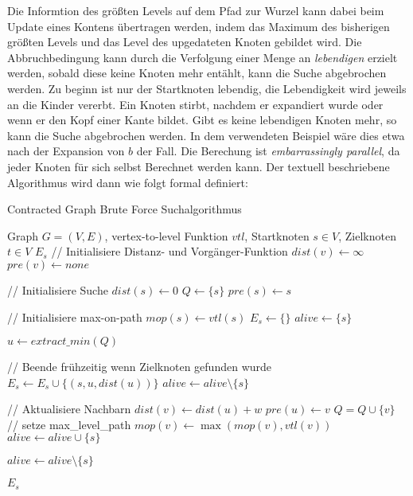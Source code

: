 Die Informtion des größten Levels auf dem Pfad zur Wurzel kann dabei beim Update eines Kontens übertragen werden, indem das Maximum des bisherigen größten Levels und das Level des upgedateten Knoten gebildet wird.
Die Abbruchbedingung kann durch die Verfolgung einer Menge an \emph{lebendigen} erzielt werden, sobald diese keine Knoten mehr entählt, kann die Suche abgebrochen werden.
Zu beginn ist nur der Startknoten lebendig, die Lebendigkeit wird jeweils an die Kinder vererbt.
Ein Knoten stirbt, nachdem er expandiert wurde oder wenn er den Kopf einer Kante bildet.
Gibt es keine lebendigen Knoten mehr, so kann die Suche abgebrochen werden.
In dem verwendeten Beispiel wäre dies etwa nach der Expansion von $b$ der Fall.
Die Berechung ist \emph{embarrassingly parallel}, da jeder Knoten für sich selbst Berechnet werden kann.
Der textuell beschriebene Algorithmus wird dann wie folgt formal definiert:

\begin{algorithm}[ht]
    \caption{Contracted Graph Brute Force Suchalgorithmus}
    \begin{algorithmic}[1]
        \Require Graph $G = (V, E)$, vertex-to-level Funktion ${vtl}$, Startknoten $s \in V$, Zielknoten $t \in V$
        \Ensure $E_s$
        \State // Initialisiere Distanz- und Vorgänger-Funktion
        \State ${dist}(v) \leftarrow \infty$
        \State ${pre}(v) \leftarrow {none}$
        \EndFor


        \State
        \State // Initialisiere Suche
        \State ${dist}(s) \leftarrow 0$
        \State $Q\leftarrow \{ s \}$
        \State ${pre}(s) \leftarrow s$

        \State
        \State // Initialisiere max-on-path
        \State ${mop}(s) \leftarrow {vtl}(s)$
        \State $E_s \leftarrow \{ \}$
        \State ${alive} \leftarrow \{ s \}$

        \State
        \State $u \leftarrow{extract\_min}(Q)$\label{graphs:dijkstra:pop}

        \State
        \State // Beende frühzeitig wenn Zielknoten gefunden wurde
        \State $E_s \leftarrow E_s \cup \{ (s, u, {dist}(u)) \}$
        \State ${alive} \leftarrow {alive} \setminus \{ s \}$
        \EndIf

        \State
        \State // Aktualisiere Nachbarn
        \State ${dist}(v) \leftarrow {dist}(u) + w$
        \State ${pre}(u) \leftarrow v$
        \State $Q = Q \cup \{ v \}$
        \State
        \State // setze max\_level\_path
        \State ${mop}(v) \leftarrow \max({mop}(v), {vtl}(v))$
        \State ${alive} \leftarrow {alive} \cup \{ s \}$
        \EndIf
        \EndIf
        \EndFor


        \State ${alive} \leftarrow {alive} \setminus \{ s \}$

        \EndWhile

        \State
        \State \Return $E_s$
    \end{algorithmic}
\end{algorithm}

